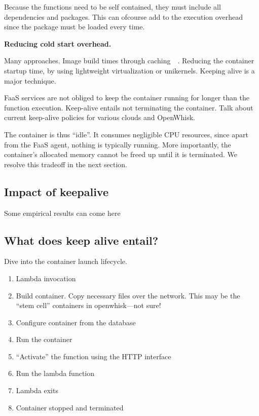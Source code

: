 Because the functions need to be self contained, they must include all dependencies and packages.
%
This can ofcourse add to the execution overhead since the package must be loaded every time. 





\textbf{Reducing cold start overhead.}

Many approaches. Image build times through caching~\cite{openlamda}~\cite{sock}.
%
Reducing the container startup time, by using lightweight virtualization or unikernels.
%
Keeping alive is a major technique.
%


FaaS services are not obliged to keep the container running for longer than the function execution.
%
Keep-alive entails not terminating the container.
%
Talk about current keep-alive policies for various clouds and OpenWhisk. 

%
The container is thus ``idle''.
%
It consumes negligible CPU resources, since apart from the FaaS agent, nothing is typically running.
%
More importantly, the container's allocated memory cannot be freed up until it is terminated.
%
We resolve this tradeoff in the next section. 





\subsection{Impact of keepalive}

Some empirical results can come here 


\subsection{What does keep alive entail?}

Dive into the container launch lifecycle.


\begin{enumerate}
\item Lambda invocation
\item Build container. Copy necessary files over the network. This may be the ``stem cell'' containers in openwhisk---not sure!
\item Configure container from the database
\item Run the container
\item  ``Activate'' the function using the HTTP interface
\item Run the lambda function 
\item Lambda exits
\item Container stopped and terminated
\end{enumerate}


